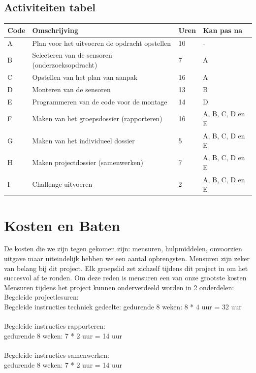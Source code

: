 \documentclass[oneside]{book}
\begin{document}
\section*{Activiteiten tabel}
\begin{tabular}{ | l | l | l | l | }
\hline
	Code & Omschrijving & Uren  & Kan pas na \\ \hline
	A & Plan voor het uitvoeren de opdracht opstellen & 10 & - \\ \hline
	B & Selecteren van de sensoren (onderzoeksopdracht) & 7 & A \\ \hline
	C & Opstellen van het plan van aanpak & 16 & A \\ \hline
	D & Monteren van de sensoren & 13 & B \\ \hline
	E & Programmeren van de code voor de montage & 14 & D \\ \hline
	F & Maken van het groepsdossier (rapporteren) & 16 & A, B, C, D en E \\ \hline
	G & Maken van het individueel dossier & 5 & A, B, C, D en E \\ \hline
	H & Maken projectdossier (samenwerken) & 7 & A, B, C, D en E \\ \hline
	I & Challenge uitvoeren & 2 & A, B, C, D en E \\ \hline
\end{tabular}


\clearpage
\chapter{Kosten en Baten}
De kosten die we zijn tegen gekomen zijn: mensuren, hulpmiddelen, onvoorzien uitgave maar uiteindelijk hebben we een aantal opbrengsten.
Mensuren zijn zeker van belang bij dit project. Elk groepslid zet zichzelf tijdens dit project in om het succesvol af te ronden. Om deze reden is mensuren een van onze grootste kosten\\

Mensuren tijdens het project kunnen onderverdeeld worden in 2 onderdelen:\\

Begeleide projectlesuren: \\
Begeleide instructies techniek gedeelte:  
gedurende 8 weken:  8 * 4  uur  =  32 uur\\
\\
Begeleide instructies rapporteren: \\
gedurende 8 weken: 7 * 2  uur   =  14 uur\\
\\
Begeleide instructies samenwerken:\\
gedurende 8 weken: 7 * 2  uur  =  14  uur\\
                                                      
\end{document}
